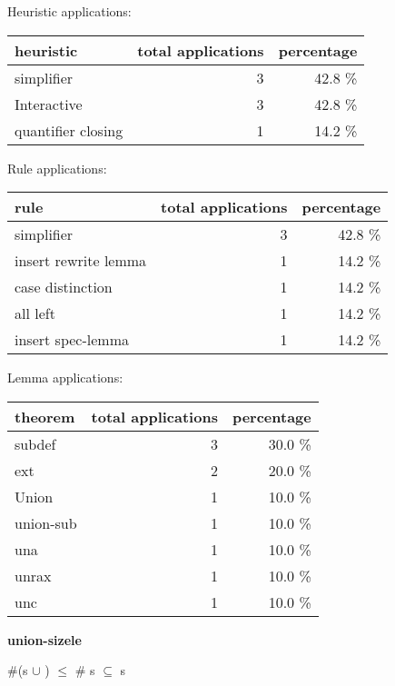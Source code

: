 \documentclass[a4paper]{article}
\begin{document}
\medskip


Heuristic applications:

\begin{supertabular}{l|r|r}
heuristic	& total applications & percentage \\ \hline
simplifier & 3 & 42.8 \% \\
Interactive & 3 & 42.8 \% \\
quantifier closing & 1 & 14.2 \% \\

\end{supertabular}

Rule applications:

\begin{supertabular}{l|r|r}
rule	        & total applications & percentage \\ \hline
simplifier & 3 & 42.8 \% \\
insert rewrite lemma & 1 & 14.2 \% \\
case distinction & 1 & 14.2 \% \\
all left & 1 & 14.2 \% \\
insert spec-lemma & 1 & 14.2 \% \\

\end{supertabular}

Lemma applications:

\begin{supertabular}{l|r|r}
theorem	        & total applications & percentage \\ \hline
subdef & 3 & 30.0 \% \\
ext & 2 & 20.0 \% \\
Union & 1 & 10.0 \% \\
union-sub & 1 & 10.0 \% \\
una & 1 & 10.0 \% \\
unrax & 1 & 10.0 \% \\
unc & 1 & 10.0 \% \\

\end{supertabular}
\pagebreak

{\LARGE\bf union-sizele}\label{lemma-union-sizele}

\medskip

 \Fol \#(s $\cup$ ) $\le$ \# s \Equiv {} $\subseteq$ s
\end{document}
